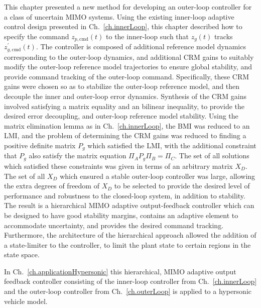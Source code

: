 This chapter presented a new method for developing an outer-loop controller for a class of uncertain MIMO systems.
Using the existing inner-loop adaptive control design presented in Ch.~\ref{ch.innerLoop}, this chapter described how to specify the command $z_{p,\text{cmd}}(t)$ to the inner-loop such that $z_{g}(t)$ tracks $z_{g,\text{cmd}}^{\prime}(t)$.
The controller is composed of additional reference model dynamics corresponding to the outer-loop dynamics, and additional CRM gains to suitably modify the outer-loop reference model trajectories to ensure global stability, and provide command tracking of the outer-loop command.
Specifically, these CRM gains were chosen so as to stabilize the outer-loop reference model, and then decouple the inner and outer-loop error dynamics.
Synthesis of the CRM gains involved satisfying a matrix equality and an bilinear inequality, to provide the desired error decoupling, and outer-loop reference model stability.
Using the matrix elimination lemma as in Ch.~\ref{ch.innerLoop}, the BMI was reduced to an LMI, and the problem of determining the CRM gains was reduced to finding a positive definite matrix $P_{g}$ which satisfied the LMI, with the additional constraint that $P_{g}$ also satisfy the matrix equation $\Pi_{A}P_{g}\Pi_{B}=\Pi_{C}$.
The set of all solutions which satisfied these constraints was given in terms of an arbitrary matrix $X_{D}$.
The set of all $X_{D}$ which ensured a stable outer-loop controller was large, allowing the extra degrees of freedom of $X_{D}$ to be selected to provide the desired level of performance and robustness to the closed-loop system, in addition to stability.
The result is a hierarchical MIMO adaptive output-feedback controller which can be designed to have good stability margins, contains an adaptive element to accommodate uncertainty, and provides the desired command tracking.
Furthermore, the architecture of the hierarchical approach allowed the addition of a state-limiter to the controller, to limit the plant state to certain regions in the state space.

In Ch.~\ref{ch.applicationHypersonic} this hierarchical, MIMO adaptive output feedback controller consisting of the inner-loop controller from Ch.~\ref{ch.innerLoop} and the outer-loop controller from Ch.~\ref{ch.outerLoop} is applied to a hypersonic vehicle model.
